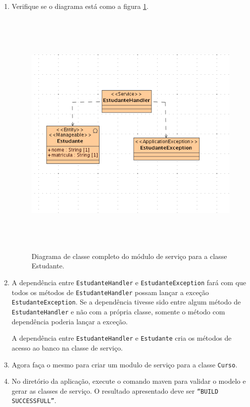\begin{enumerate}
\item Verifique se o diagrama está como a figura
\ref{resultado_diagrama_classe_servico}.
\begin{figure}[H]
	\centering
	\includegraphics[width=360pt,height=350pt]{imgs/tutorial-mdarte-0011.png}
	\caption{Diagrama de classe completo do módulo de serviço para a classe
	Estudante.}
	\label{resultado_diagrama_classe_servico}
\end{figure}

\item A dependência entre \texttt{EstudanteHandler} e
\texttt{EstudanteException} fará com que todos os métodos de
\texttt{EstudanteHandler} possam lançar a exceção \texttt{EstudanteException}.
Se a dependência tivesse sido entre algum método de \texttt{EstudanteHandler} e
não com a própria classe, somente o método com dependência poderia lançar a
exceção.

A dependência entre \texttt{EstudanteHandler} e \texttt{Estudante} cria os
métodos de acesso ao banco na classe de serviço.

\item Agora faça o mesmo para criar um modulo de serviço para a classe
\texttt{Curso}.
	
\item No diretório da aplicação, execute o comando maven para validar o modelo e
gerar as classes de serviço. O resultado apresentado deve ser \texttt{“BUILD
SUCCESSFULL”}.
\end{enumerate}

